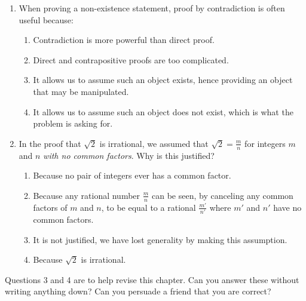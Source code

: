 \pagestyle{empty}


\begin{enumerate}
  \item When proving a non-existence statement, proof by contradiction is often useful because:
  \begin{enumerate}
    \item Contradiction is more powerful than direct proof.
    \item Direct and contrapositive proofs are too complicated.
    \item It allows us to assume such an object exists, hence providing an object that may be manipulated.
    \item It allows us to assume such an object does not exist, which is what the problem is asking for.
  \end{enumerate}
  
  
  \item In the proof that $\sqrt{2}$ is irrational, we assumed that $\sqrt{2}=\frac{m}{n}$ for integers $m$ and $n$ \emph{with no common factors}. Why is this justified?
  \begin{enumerate}
      \item Because no pair of integers ever has a common factor.
      \item Because any rational number $\frac mn$ can be seen, by canceling any common factors of $m$ and $n$, to be equal to a rational $\frac{m'}{n'}$ where $m'$ and $n'$ have no common factors.
      \item It is not justified, we have lost generality by making this assumption.
      \item Because $\sqrt{2}$ is irrational.
  \end{enumerate}
\end{enumerate}


Questions 3 and 4 are to help revise this chapter. Can you answer these without writing anything down? Can you persuade a friend that you are correct?

